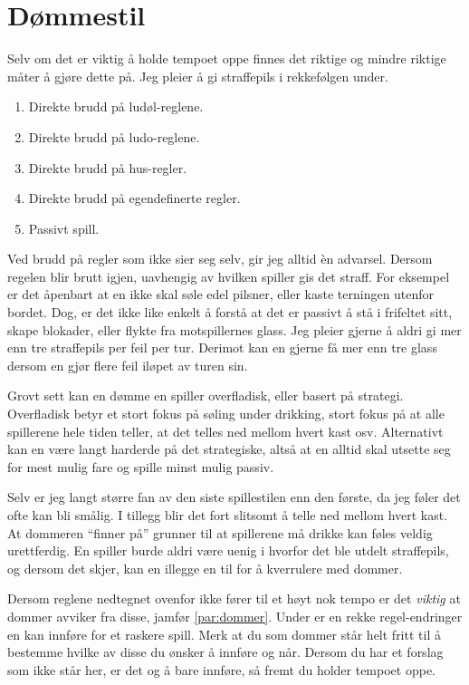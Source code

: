 \documentclass[10pt,a4paper,norsk,openany]{book}
\begin{document}
\section{Dømmestil}

Selv om det er viktig å holde tempoet oppe finnes det riktige og mindre riktige
måter å gjøre dette på. Jeg pleier å gi straffepils i rekkefølgen under.

\begin{enumerate}
  \item Direkte brudd på ludøl-reglene.
  \item Direkte brudd på ludo-reglene.
  \item Direkte brudd på hus-regler.
  \item Direkte brudd på egendefinerte regler.
  \item Passivt spill.
\end{enumerate}

Ved brudd på regler som ikke sier seg selv, gir jeg alltid èn advarsel. Dersom
regelen blir brutt igjen, uavhengig av hvilken spiller gis det straff. For
eksempel er det åpenbart at en ikke skal søle edel pilsner, eller kaste
terningen utenfor bordet. Dog, er det ikke like enkelt å forstå at det er
passivt å stå i frifeltet sitt, skape blokader, eller flykte fra motspillernes
glass. Jeg pleier gjerne å aldri gi mer enn tre straffepils per feil per tur.
Derimot kan en gjerne få mer enn tre glass dersom en gjør flere feil iløpet av
turen sin.

Grovt sett kan en dømme en spiller overfladisk, eller basert på strategi.
Overfladisk betyr et stort fokus på søling under drikking, stort fokus på at
alle spillerene hele tiden teller, at det telles ned mellom hvert kast osv.
Alternativt kan en være langt harderde på det strategiske, altså at en alltid
skal utsette seg for mest mulig fare og spille minst mulig passiv.

Selv er jeg langt større fan av den siste spillestilen enn den første, da jeg
føler det ofte kan bli smålig. I tillegg blir det fort slitsomt å telle ned
mellom hvert kast. At dommeren ``finner på'' grunner til at spillerene må drikke
kan føles veldig urettferdig. En spiller burde aldri være uenig i hvorfor det
ble utdelt straffepils, og dersom det skjer, kan en illegge en til for å
kverrulere med dommer.

Dersom reglene nedtegnet ovenfor ikke fører til et høyt nok tempo er det
\emph{viktig} at dommer avviker fra disse, jamfør \cref{par:dommer}. Under er en
rekke regel-endringer en kan innføre for et raskere spill. Merk at du som dommer
står helt fritt til å bestemme hvilke av disse du ønsker å innføre og når.
Dersom du har et forslag som ikke står her, er det og å bare innføre, så fremt
du holder tempoet oppe.
\end{document}
